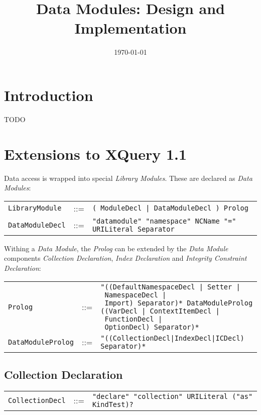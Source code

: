 \documentclass[]{article}
\title{Data Modules: Design and Implementation}
\author{  }
\date{\today}
\begin{document}
\ifpdf
{}
\else
{}
\fi

\maketitle



\section{Introduction}
TODO 


\section{Extensions to XQuery 1.1}
Data access is wrapped into special \textit{Library Modules}. These are declared as \textit{Data Modules}:

\vspace{0.25cm}
\begin{tabular}{l c p{12cm}}
{\tt LibraryModule}  & ::= & {\tt ( ModuleDecl | DataModuleDecl ) Prolog} \\
{\tt DataModuleDecl} & ::= & {\tt "datamodule" "namespace" NCName "=" URILiteral\ Separator}
\end{tabular}

\vspace{0.5cm}
\noindent
Withing a \textit{Data Module}, the \textit{Prolog} can be extended by the \textit{Data Module} components \textit{Collection Declaration}, \textit{Index Declaration} and \textit{Integrity Constraint Declaration}:
\par
\vspace{0.25cm}
\begin{tabular}{l c p{12cm}}
{\tt Prolog}           & ::= & {\tt "((DefaultNamespaceDecl\ |\ Setter\ |\ NamespaceDecl\ |\ Import)\ Separator)*\ DataModuleProlog ((VarDecl\ |\ ContextItemDecl\ |\ FunctionDecl\ |\ OptionDecl)\ Separator)*} \\
{\tt DataModuleProlog} & ::= & {\tt "((CollectionDecl|IndexDecl|ICDecl) Separator)*} 
\end{tabular}

\subsection{Collection Declaration}
\begin{tabular}{l c p{12cm}}
{\tt CollectionDecl} & ::= & {\tt "declare" "collection" URILiteral ("as" KindTest)?}
\end{tabular}
\end{document}
